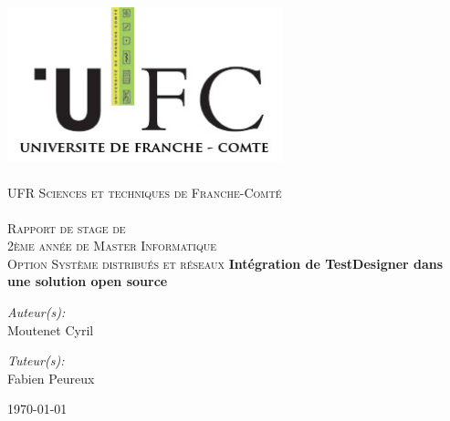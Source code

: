 \begin{titlepage}
\begin{center}
%
\includegraphics[width=80mm]{images/logo-ufc.jpg}\\
%
\ \\ %
\textsc{\Large
%
UFR Sciences et techniques de Franche-Comté\\
\ \\
Rapport de stage de\\2ème année de Master Informatique\\
Option Système distribués et réseaux}
\vfill %
%
%
{\huge \bfseries
Intégration de TestDesigner dans une solution open source
\\}
\vfill %

\begin{minipage}{0.4\textwidth}
\begin{flushleft} \large
\emph{Auteur(s):}\\
Moutenet Cyril
\end{flushleft}
\end{minipage}
%
\begin{minipage}{0.4\textwidth}
\begin{flushright} \large
\emph{Tuteur(s):} \\
Fabien Peureux
\footnotesize{\ }
\end{flushright}
\end{minipage}
%
\vfill %
%
{\large \today}
%
\end{center}
\end{titlepage}
